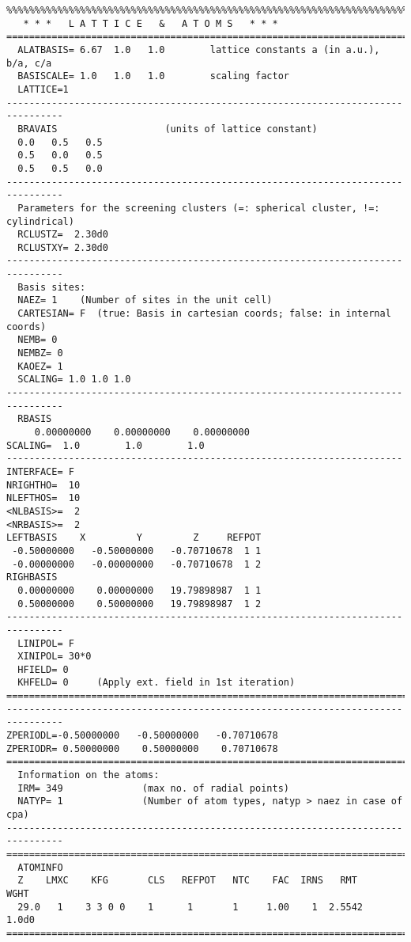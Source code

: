 \documentclass[11pt,fleqn]{book} %
\begin{document}
\begin{VBox}
{{\begin{verbatim}
%%%%%%%%%%%%%%%%%%%%%%%%%%%%%%%%%%%%%%%%%%%%%%%%%%%%%%%%%%%%%%%%%%%%%%%%%%%%%%%%
   * * *   L A T T I C E   &   A T O M S   * * *
================================================================================
  ALATBASIS= 6.67  1.0   1.0        lattice constants a (in a.u.), b/a, c/a
  BASISCALE= 1.0   1.0   1.0        scaling factor
  LATTICE=1
--------------------------------------------------------------------------------
  BRAVAIS                   (units of lattice constant)
  0.0   0.5   0.5
  0.5   0.0   0.5
  0.5   0.5   0.0
--------------------------------------------------------------------------------
  Parameters for the screening clusters (=: spherical cluster, !=: cylindrical)
  RCLUSTZ=  2.30d0
  RCLUSTXY= 2.30d0
--------------------------------------------------------------------------------
  Basis sites:
  NAEZ= 1    (Number of sites in the unit cell)
  CARTESIAN= F  (true: Basis in cartesian coords; false: in internal coords)
  NEMB= 0
  NEMBZ= 0
  KAOEZ= 1
  SCALING= 1.0 1.0 1.0
--------------------------------------------------------------------------------
  RBASIS
     0.00000000    0.00000000    0.00000000
SCALING=  1.0        1.0        1.0
----------------------------------------------------------------------
INTERFACE= F
NRIGHTHO=  10    
NLEFTHOS=  10    
<NLBASIS>=  2
<NRBASIS>=  2
LEFTBASIS    X         Y         Z     REFPOT
 -0.50000000   -0.50000000   -0.70710678  1 1
 -0.00000000   -0.00000000   -0.70710678  1 2
RIGHBASIS
  0.00000000    0.00000000   19.79898987  1 1
  0.50000000    0.50000000   19.79898987  1 2
--------------------------------------------------------------------------------
  LINIPOL= F
  XINIPOL= 30*0
  HFIELD= 0
  KHFELD= 0     (Apply ext. field in 1st iteration)
================================================================================
--------------------------------------------------------------------------------
ZPERIODL=-0.50000000   -0.50000000   -0.70710678
ZPERIODR= 0.50000000    0.50000000    0.70710678
================================================================================
  Information on the atoms:
  IRM= 349              (max no. of radial points)
  NATYP= 1              (Number of atom types, natyp > naez in case of cpa)
--------------------------------------------------------------------------------
================================================================================
  ATOMINFO
  Z    LMXC    KFG       CLS   REFPOT   NTC    FAC  IRNS   RMT     WGHT
  29.0   1    3 3 0 0    1      1       1     1.00    1  2.5542   1.0d0
================================================================================


\end{verbatim}}}
\end{VBox}
\end{document}
